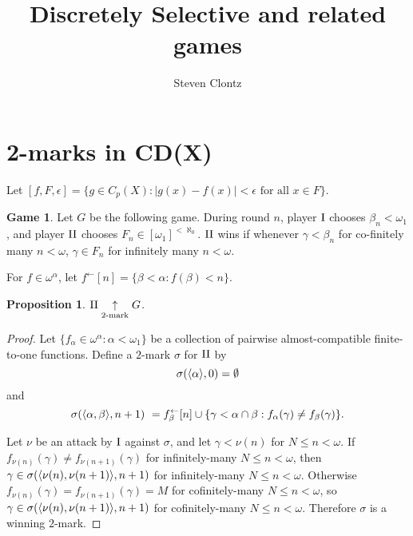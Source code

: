\documentclass[11pt]{article}
\title{Discretely Selective and related games}
\author{Steven Clontz}
\theoremstyle{plain}
\newtheorem{proposition}[theorem]{Proposition}
\theoremstyle{definition}
\newtheorem{game}[theorem]{Game}
\theoremstyle{remark}
\theoremstyle{plain}
\theoremstyle{definition}
\theoremstyle{remark}
\begin{document}
\maketitle

\section{2-marks in CD(X)}

Let 
\(
  [f,F,\epsilon]
    =
  \{g\in C_p(X):|g(x)-f(x)|<\epsilon\text{ for all }x\in F\}
\).

\begin{game}
  Let \(G\) be the following game. During round \(n\), player \(\mathrm{I}\)
  chooses \(\beta_n<\omega_1\), and player \(\mathrm{II}\) chooses
  \(F_n\in[\omega_1]^{<\aleph_0}\). \(\mathrm{II}\) wins if
  whenever \(\gamma<\beta_n\) for co-finitely many \(n<\omega\),
  \(\gamma\in F_n\) for infinitely many \(n<\omega\).
\end{game}

For \(f\in\omega^\alpha\), let 
\(f^{\leftarrow}[n]=\{\beta<\alpha:f(\beta)<n\}\).

\begin{proposition}
  \(\mathrm{II} \underset{2\text{-mark}}{\uparrow} G\).
\end{proposition}
\begin{proof}
  Let \(\{f_\alpha\in\omega^\alpha:\alpha<\omega_1\}\) be a collection
  of pairwise almost-compatible finite-to-one functions.
  Define a \(2\)-mark \(\sigma\) for \(\mathrm{II}\) by
  \[\sigma(\langle\alpha\rangle,0)=\emptyset\] and
  \[
    \sigma(\langle\alpha,\beta\rangle,n+1)\
      =
    f_\beta^\leftarrow[n]
      \cup
    \{\gamma<\alpha\cap\beta:f_\alpha(\gamma)\not=f_\beta(\gamma)\}
  .\]
  
  Let \(\nu\) be an attack by \(\mathrm{I}\) against \(\sigma\), and let
  \(\gamma<\nu(n)\) for \(N\leq n<\omega\).
  If \(f_{\nu(n)}(\gamma)\not=f_{\nu(n+1)}(\gamma)\) for infinitely-many
  \(N\leq n<\omega\), then \(\gamma\in\sigma(\langle\nu(n),\nu(n+1)\rangle,n+1)\)
  for infinitely-many \(N\leq n<\omega\).
  Otherwise \(f_{\nu(n)}(\gamma)=f_{\nu(n+1)}(\gamma)=M\) for cofinitely-many
  \(N\leq n<\omega\), so \(\gamma\in\sigma(\langle\nu(n),\nu(n+1)\rangle,n+1)\)
  for cofinitely-many \(N\leq n<\omega\). Therefore \(\sigma\) is a winning \(2\)-mark.
\end{proof}
\end{document}
